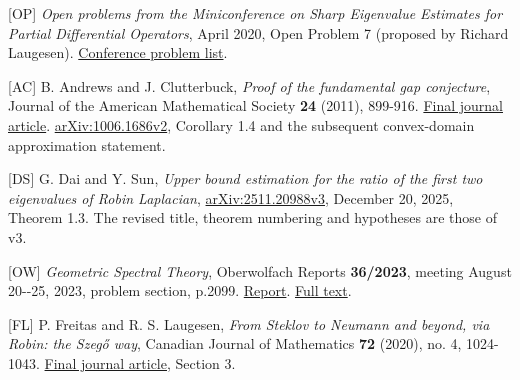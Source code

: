 \documentclass[11pt]{article}
\begin{document}
{[}OP{]} \emph{Open problems from the Miniconference on Sharp Eigenvalue
Estimates for Partial Differential Operators}, April 2020, Open Problem
7 (proposed by Richard Laugesen).
\href{https://publish.illinois.edu/eigenvalues2020/files/2020/04/Open-problems.pdf}{Conference
problem list}.

{[}AC{]} B. Andrews and J. Clutterbuck, \emph{Proof of the fundamental
gap conjecture}, Journal of the American Mathematical Society
\textbf{24} (2011), 899-916.
\href{https://doi.org/10.1090/S0894-0347-2011-00699-1}{Final journal
article}. \href{https://arxiv.org/abs/1006.1686v2}{arXiv:1006.1686v2},
Corollary 1.4 and the subsequent convex-domain approximation statement.

{[}DS{]} G. Dai and Y. Sun, \emph{Upper bound estimation for the ratio
of the first two eigenvalues of Robin Laplacian},
\href{https://arxiv.org/abs/2511.20988v3}{arXiv:2511.20988v3}, December
20, 2025, Theorem 1.3. The revised title, theorem numbering and
hypotheses are those of v3.

{[}OW{]} \emph{Geometric Spectral Theory}, Oberwolfach Reports
\textbf{36/2023}, meeting August 20-\/-25, 2023, problem section,
p.2099. \href{https://doi.org/10.4171/OWR/2023/36}{Report}.
\href{https://ems.press/content/serial-article-files/47475}{Full text}.

{[}FL{]} P. Freitas and R. S. Laugesen, \emph{From Steklov to Neumann
and beyond, via Robin: the Szeg\H{o} way}, Canadian Journal of Mathematics
\textbf{72} (2020), no. 4, 1024-1043.
\href{https://doi.org/10.4153/S0008414X19000154}{Final journal article},
Section 3.
\end{document}
